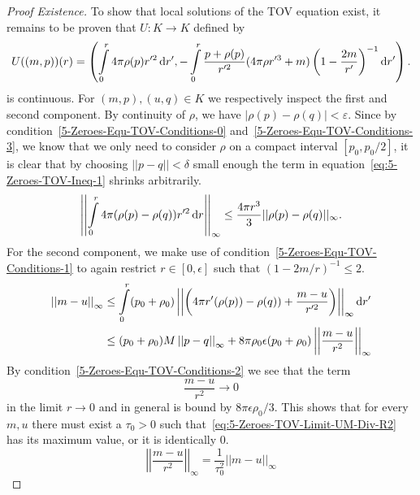 \begin{proof}[Proof  Existence]
	To show that local solutions of the \ac{TOV} equation exist, it remains to be proven that $U:K\rightarrow K$ defined by
	\begin{equation}
		U((m,p))(r)=\left(\int\limits_0^r 4\pi\rho(p) r'^2 \mathop{}\!\mathrm{d} r',-\int\limits_0^r\frac{p+\rho(p)}{r'^2}(4\pi\rho r'^3 + m)\left(1-\frac{2m}{r'}\right)^{-1}\mathop{}\!\mathrm{d} r'\right).
		\label{eq:5-Zeroes-TOV-Operator-Def}
	\end{equation}
	is continuous.
	For $(m,p),(u,q)\in K$ we respectively inspect the first and second component.
	By continuity of $\rho$, we have $|\rho(p)-\rho(q)|<\varepsilon$.
	Since by condition~\eqref{5-Zeroes-Equ-TOV-Conditions-0} and~\eqref{5-Zeroes-Equ-TOV-Conditions-3}, we know that we only need to consider $\rho$ on a compact interval $[p_0,p_0/2]$, it is clear that by choosing $||p-q||<\delta$ small enough the term in equation~\eqref{eq:5-Zeroes-TOV-Ineq-1} shrinks arbitrarily.
	\begin{equation}
		\left|\left|\int\limits_0^r 4\pi(\rho(p)-\rho(q))r'^2\mathop{}\!\mathrm{d} r\right|\right|_\infty\leq \frac{4\pi r^3}{3}||\rho(p)-\rho(q)||_\infty.
		\label{eq:5-Zeroes-TOV-Ineq-1}
	\end{equation}
	For the second component, we make use of condition~\eqref{5-Zeroes-Equ-TOV-Conditions-1} to again restrict $r\in[0,\epsilon]$ such that $(1-2m/r)^{-1}\leq2$.
	\begin{align}
		\left|\left|m-u\right|\right|_\infty &\leq \int\limits_0^r(p_0+\rho_0)\left|\left|\left(4\pi r'(\rho(p))-\rho(q))+\frac{m-u}{r'^2}\right)\right|\right|_\infty\mathop{}\!\mathrm{d} r'\\
		&\leq (p_0+\rho_0)M\left|\left|p-q\right|\right|_\infty + 8\pi\rho_0\epsilon(p_0+\rho_0)\left|\left|\frac{m-u}{r^2}\right|\right|_\infty
		\label{eq:5-Zeroes-TOV-Ineq-2}
	\end{align}
	By condition~\eqref{5-Zeroes-Equ-TOV-Conditions-2} we see that the term
	\begin{equation}
		\frac{m-u}{r^2}\rightarrow0
		\label{eq:5-Zeroes-TOV-Limit-UM-Div-R2}
	\end{equation}
	in the limit $r\rightarrow0$ and in general is bound by $8\pi\epsilon\rho_0/3$.
	This shows that for every $m,u$ there must exist a $\tau_0>0$ such that~\eqref{eq:5-Zeroes-TOV-Limit-UM-Div-R2} has its maximum value, or it is identically $0$.
	\begin{equation}
		\left|\left|\frac{m-u}{r^2}\right|\right|_{\infty} = \frac{1}{\tau_0^2}||m-u||_{\infty}

\end{equation}
\end{proof}

